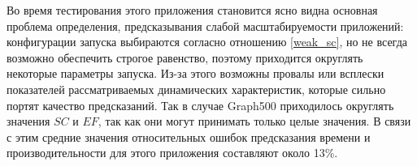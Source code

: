 		Во время тестирования этого приложения становится ясно видна основная проблема определения, предсказывания слабой масштабируемости приложений: конфигурации запуска выбираются согласно отношению \eqref{weak_sc}, но не всегда возможно обеспечить строгое равенство, поэтому приходится округлять некоторые параметры запуска. Из-за этого возможны провалы или всплески показателей рассматриваемых динамических характеристик, которые сильно портят качество предсказаний. Так в случае Graph500 приходилось округлять значения \(SC\) и \(EF\), так как они могут принимать только целые значения. В связи с этим средние значения относительных ошибок предсказания времени и производительности для этого приложения составляют около 13\%.
\clearpage
